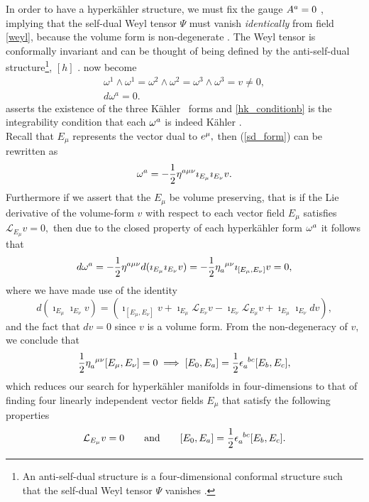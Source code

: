 \documentclass[a4paper,12pt, onecolumn, notitlepage]{article}
\theoremstyle{definition}
\theoremstyle{remark}
\newcommand{\w}{\omega}
\newcommand{\m}{\mu}
\newcommand{\n}{\nu}
\newcommand{\e}{\epsilon}
\newcommand{\K}{K\"ahler }
\newcommand{\HK}{hyperk\"ahler }
\newcommand{\ihooft}[3]{\eta\indices{_{#1}^{#2}^{#3}}}
\begin{document}
In order to have a \HK structure, we must fix the gauge $A\indices{^a}=0$ \cite{capovilla_1991}, implying that the self-dual Weyl tensor $\Psi$ must vanish \emph{identically} from field \cref{weyl}, because the volume form is non-degenerate \cite{capovilla_1993}. The Weyl tensor is conformally invariant and can be thought of being defined by the anti-self-dual structure\footnote{An anti-self-dual structure is a four-dimensional conformal structure such that the self-dual Weyl tensor $\Psi$ vanishes \cite{solitons}.}, $[h]$ \cite{solitons}.  now become
\begin{subequations}
	\begin{gather}
	\label{hk_conditiona}
	\w^{1}\wedge\w^{1} = \w^{2}\wedge\w^{2} =\w^{3}\wedge\w^{3} = v\neq 0,\\
	\label{hk_conditionb}
	d\w^{a} = 0. 
	\end{gather}
\end{subequations}
 asserts the existence of the three \K\ forms and \cref{hk_conditionb} is the integrability condition that each $\w\indices{^a}$ is indeed \K.\\


Recall that $E_{\m}$ represents the vector dual to $e\indices{^\m},$ then (\ref{sd_form}) can be rewritten as \cite{hashimoto_1997}
\begin{equation}
\w^{a} = -\frac{1}{2}\eta\indices{^{a}^{\m}^{\n}}\imath_{E_{\m}}\imath_{E_{\n}}v.
\end{equation}
Furthermore if we assert that the $E_{\m}$ be volume preserving, that is if the Lie derivative of the volume-form $v$ with respect to each vector field $E_{\m}$ satisfies $\mathcal{L}_{E_{\m}}v = 0,$ then due to the closed property of each \HK form $\w\indices{^a}$ it follows that
\begin{align}
	d\w^{a} = -\frac{1}{2}\eta\indices{^{a}^{\m}^{\n}}d(\imath_{E_{\m}}\imath_{E_{\n}}v) = -\frac{1}{2}\ihooft{a}{\m}{\n}\imath_{[E_{\m},E_{\n}]}v=0,
\end{align}
where we have made use of the identity \cite{donaldson}
\begin{equation}
	\label{cartan}
	d(\imath_{E_{\m}}\imath_{E_{\n}}v)=(\imath_{[E_{\m},E_{\n}]}v + \imath_{E_{\m}}\mathcal{L}_{E_{\n}}v - \imath_{E_{\n}}\mathcal{L}_{E_{\m}}v + \imath_{E_{\m}}\imath_{E_{\n}}dv),
\end{equation}
and the fact that $dv=0$ since $v$ is a volume form. From the non-degeneracy of $v,$ we conclude that
\begin{equation}
	\label{half_flat}
	\frac{1}{2}\ihooft{a}{\m}{\n}[E_{\m},E_{\n}] = 0 \implies [E_{0},E_{a}]=\frac{1}{2}\e\indices{_a^b^c}[E_{b},E_{c}],
\end{equation}
which reduces our search for \HK manifolds in four-dimensions to that of finding four linearly independent vector fields $E_{\m}$ that satisfy the following properties \cite{hashimoto_1997}
\begin{gather}
	\label{asj}
	\mathcal{L}_{E_{\m}}v = 0\qquad \text{and}\qquad [E_{0},E_{a}]=\frac{1}{2}\e\indices{_a^b^c}[E_{b},E_{c}].
\end{gather}
\end{document}
